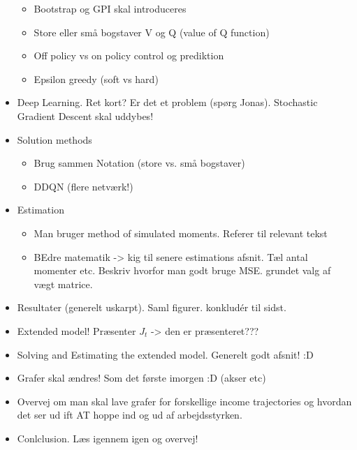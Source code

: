 \documentclass{article}
\begin{document}
\begin{itemize}
\begin{itemize}
        \item Bootstrap og GPI skal introduceres
        \item Store eller små bogstaver V og Q (value of Q function)
        \item Off policy vs on policy control og prediktion
        \item Epsilon greedy (soft vs hard)
    \end{itemize}
    \item Deep Learning. Ret kort? Er det et problem (spørg Jonas). Stochastic Gradient Descent skal uddybes!
    \item Solution methods
    \begin{itemize}
        \item Brug sammen Notation (store vs. små bogstaver)
        \item DDQN (flere netværk!)
    \end{itemize}
    \item Estimation 
    \begin{itemize}
        \item Man bruger method of simulated moments. Referer til relevant tekst
        \item BEdre matematik -> kig til senere estimations afsnit. Tæl antal momenter etc. Beskriv hvorfor man godt bruge MSE. grundet valg af vægt matrice.
    \end{itemize}
    \item Resultater (generelt uskarpt). Saml figurer. konkludér til sidst.
    \item Extended model! Præsenter $J_t$ -> den er præsenteret???
    \item Solving and Estimating the extended model. Generelt godt afsnit! :D
    \item Grafer skal ændres! Som det første imorgen :D (akser etc)
    \item Overvej om man skal lave grafer for forskellige income trajectories og hvordan det ser ud ift AT hoppe ind og ud af arbejdsstyrken.
    \item Conlclusion. Læs igennem igen og overvej!
\end{itemize}

\pagebreak








\end{document}
